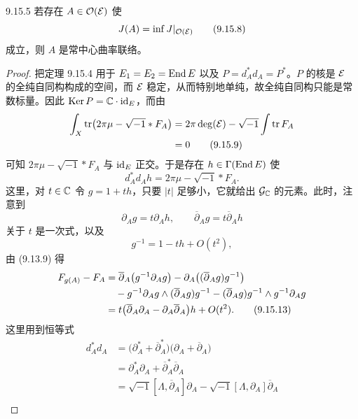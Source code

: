\begin{proposition*}{9.15.5}
  若存在 $A\in\mathcal{O}(\mathcal{E})$ 使
  \begin{equation}
    J(A)=\inf J|_{\mathcal{O}(\mathcal{E})}
    \tag{9.15.8}
  \end{equation}
  成立，则 $A$ 是常中心曲率联络。
\end{proposition*}
\begin{proof}
  把定理 9.15.4 用于 $E_1=E_2=\operatorname{End} E$ 以及 $P=d_A^*d_A=P^*$。$P$ 的核是 $\mathcal{E}$ 的全纯自同构构成的空间，而 $\mathcal{E}$ 稳定，从而特别地单纯，故全纯自同构只能是常数标量。因此 $\operatorname{Ker} P=\mathbb{C}\cdot\mathrm{id}_E$，而由
  \begin{align}
    \int_X\operatorname{tr}\bigl(2\pi\mu-\sqrt{-1}\ast F_A\bigr)
    &=2\pi\deg(\mathcal{E})-\sqrt{-1}\int\operatorname{tr} F_A \notag\\
    &=0
    \tag{9.15.9}
  \end{align}
  可知 $2\pi\mu-\sqrt{-1}\ast F_A$ 与 $\mathrm{id}_E$ 正交。于是存在 $h\in\Gamma(\operatorname{End} E)$ 使
  \begin{equation}
    d_A^*d_Ah=2\pi\mu-\sqrt{-1}\ast F_A.
    \tag{9.15.10}
  \end{equation}
  这里，对 $t\in\mathbb{C}$ 令 $g=1+th$，只要 $|t|$ 足够小，它就给出 $\mathcal{G}_{\mathbb{C}}$ 的元素。此时，注意到
  \begin{equation}
    \partial_Ag=t\partial_Ah,\qquad \overline{\partial}_Ag=t\overline{\partial}_Ah
    \tag{9.15.11}
  \end{equation}
  关于 $t$ 是一次式，以及
  \begin{equation}
    g^{-1}=1-th+O(t^2),
    \tag{9.15.12}
  \end{equation}
  由 (9.13.9) 得
  \begin{align}
    F_{g(A)}-F_A
    &=\overline{\partial}_A\bigl(g^{-1}\partial_Ag\bigr)-\partial_A\bigl((\overline{\partial}_Ag)g^{-1}\bigr) \notag\\
    &\quad-g^{-1}\partial_Ag\wedge(\overline{\partial}_Ag)g^{-1}-(\overline{\partial}_Ag)g^{-1}\wedge g^{-1}\partial_Ag \notag\\
    &=t\bigl(\overline{\partial}_A\partial_A-\partial_A\overline{\partial}_A\bigr)h+O(t^2).
    \tag{9.15.13}
  \end{align}
  这里用到恒等式
  \begin{align*}
    d_A^*d_A&=\bigl(\partial_A^*+\overline{\partial}_A^*\bigr)\bigl(\partial_A+\overline{\partial}_A\bigr)\\
    &=\partial_A^*\partial_A+\overline{\partial}_A^*\overline{\partial}_A\\
    &=\sqrt{-1}[\Lambda,\overline{\partial}_A]\partial_A-\sqrt{-1}[\Lambda,\partial_A]\overline{\partial}_A\\

\end{align*}
\end{proof}
